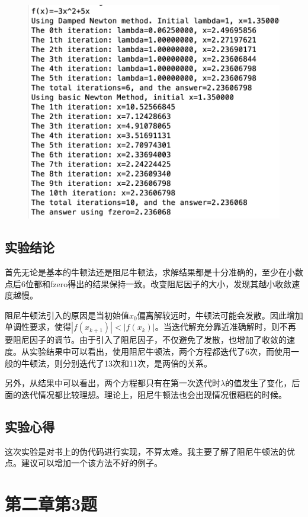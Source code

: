 \documentclass[12pt, utf8, hyperref]{article}
\begin{document}
\begin{figure}[H]
	\centering
	\includegraphics[scale=0.5]{photos/2.png}
\end{figure}

\subsection*{实验结论}
首先无论是基本的牛顿法还是阻尼牛顿法，求解结果都是十分准确的，至少在小数点后6位都和fzero得出的结果保持一致。改变阻尼因子的大小，发现其越小收敛速度越慢。

阻尼牛顿法引入的原因是当初始值$x_{0}$偏离解较远时，牛顿法可能会发散。因此增加单调性要求，使得$|f(x_{k+1})|<|f(x_{k})|$。当迭代解充分靠近准确解时，则不再要阻尼因子的调节。由于引入了阻尼因子，不仅避免了发散，也增加了收敛的速度。从实验结果中可以看出，使用阻尼牛顿法，两个方程都迭代了6次，而使用一般的牛顿法，则分别迭代了13次和11次，是两倍的关系。

另外，从结果中可以看出，两个方程都只有在第一次迭代时$\lambda$的值发生了变化，后面的迭代情况都比较理想。理论上，阻尼牛顿法也会出现情况很糟糕的时候。

\subsection*{实验心得}
这次实验是对书上的伪代码进行实现，不算太难。我主要了解了阻尼牛顿法的优点。建议可以增加一个该方法不好的例子。

\section{第二章第3题}
\end{document}
